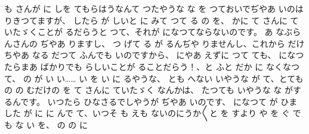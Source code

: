 も
さんが
に
しを
てもらはうなんて
つたやうな
な
を
つておいでぢやあ
いのは
りきつてますが、
したら
が
しいと
に
みて
つて
る
の
を、
かに
て
さんに
ていたゞくことが
るだらうと
つて、それが
になつてならないのです。
あ
なぶらんさんの
ぢやあ
りますし、
つ
げて
る
が
るんぢや
りませんし、これから
だけ
ちやあ
なる
だつて
ふんでも
いのですから、
にやあ
えずに
つて
ても、
になつたらまあ
ばかりでも
らしいことが
ることだらう！、と
ふと
だか
に
なくなつて、
の
が
い
い……
い
を
い
に
るやうな、
とも
へない
いやうな
が
て、とても
の
の
むだけの
を
て
さんに
ていたゞく
なんかは、
たつても
いやうな
な
がするんです。
いつたら
ひなさるでしやうが
ぢやあ
いのです、
になつて
が
ひました
が
に
に
んで
て、いつそ
も
えも
ないのにうか〳〵と
を
すより
や
を
ぐ
でも
な
い
を、
の
の
に
